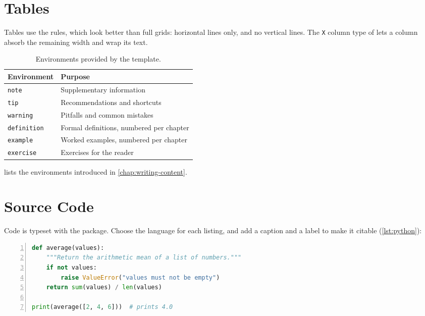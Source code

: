 \section{Tables}\label{sec:tables}

Tables use the  rules, which look better than full grids:
horizontal lines only, and no vertical lines. The \texttt{X} column type of
 lets a column absorb the remaining width and wrap its text.

\begin{table}[tb]
  \centering
  \caption{Environments provided by the template.}
  \label{tab:environments}
  \begin{tabularx}{\linewidth}{@{}lX@{}}
    \toprule
    Environment & Purpose \\
    \midrule
    \texttt{note}       & Supplementary information \\
    \texttt{tip}        & Recommendations and shortcuts \\
    \texttt{warning}    & Pitfalls and common mistakes \\
    \texttt{definition} & Formal definitions, numbered per chapter \\
    \texttt{example}    & Worked examples, numbered per chapter \\
    \texttt{exercise}   & Exercises for the reader \\
    \bottomrule
  \end{tabularx}
\end{table}

 lists the environments introduced in
\cref{chap:writing-content}.

\section{Source Code}\label{sec:code}

Code is typeset with the  package. Choose the language for each
listing, and add a caption and a label to make it citable
(\cref{lst:python}):

\begin{lstlisting}[language=Python, caption={A short Python function.},
                   label={lst:python}, numbers=left, xleftmargin=2.2em]
def average(values):
    """Return the arithmetic mean of a list of numbers."""
    if not values:
        raise ValueError("values must not be empty")
    return sum(values) / len(values)

print(average([2, 4, 6]))  # prints 4.0
\end{lstlisting}

